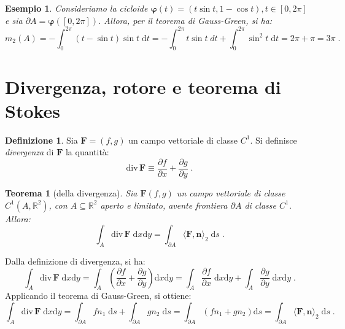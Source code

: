 \documentclass[a4paper,12pt]{report}
\theoremstyle{plain}
\newtheorem{thm}{Teorema}[section]
\newtheorem{exm}{Esempio}[section]
\theoremstyle{definition}
\newtheorem{defn}{Definizione}[section]
\theoremstyle{remark}
\newcommand{\Div}{\mathrm{div}\,}
\newcommand{\diff}[1]{\mathrm{d}#1}
\numberwithin{equation}{section}
\begin{document}
\begin{exm} Consideriamo la cicloide $\boldsymbol{\varphi}(t)=(t\sin t,1-\cos t),t\in[0,2\pi]$ e sia $\partial A=\boldsymbol{\varphi}([0,2\pi])$. Allora, per il teorema di Gauss-Green, si ha:
\begin{equation}
m_2(A)=-\int_0^{2\pi} (t-\sin t)\sin t\;\diff{t}=-\int_0^{2\pi}t\sin t\;dt+\int_0^{2\pi}\sin^2 t\;\diff{t} =2\pi+\pi=3\pi\;.
\end{equation}
\end{exm}
\section{Divergenza, rotore e teorema di Stokes}
\begin{defn} Sia $\mathbf{F}=(f,g)$ un campo vettoriale di classe $C^1$. Si definisce \textit{divergenza} di $\mathbf{F}$ la quantità:
\begin{equation}
\Div \mathbf{F}\equiv \frac{\partial f}{\partial x}+\frac{\partial g}{\partial y}\;.
\end{equation}
\end{defn}
\begin{thm}[della divergenza] Sia $\mathbf{F}(f,g)$ un campo vettoriale di classe $C^1(A,\mathbb{R}^2)$, con $A\subseteq\mathbb{R}^2$ aperto e limitato, avente frontiera $\partial A$ di classe $C^1$. Allora:
\begin{equation}
\int_A \Div \mathbf{F}\;\diff{x}\diff{y}=\int_{\partial A}\langle \mathbf{F},\mathbf{n}\rangle_2\;\diff{s}\;.
\end{equation}
\end{thm}
\proof Dalla definizione di divergenza, si ha:
\begin{equation}
\int_A \Div \mathbf{F}\;\diff{x}\diff{y}=\int_A \left(\frac{\partial f}{\partial x}+\frac{\partial g}{\partial y}\right)\diff{x}\diff{y}=\int_A\frac{\partial f}{\partial x}\;\diff{x}\diff{y}+\int_A \frac{\partial g}{\partial y}\;\diff{x}\diff{y}\;.
\end{equation}
Applicando il teorema di Gauss-Green, si ottiene:
\begin{equation}
\int_A\Div\mathbf{F}\;\diff{x}\diff{y}=\int_{\partial A}fn_1\;\diff{s}+\int_{\partial A}gn_2\;\diff{s}=\int_{\partial A}(fn_1+gn_2)\diff{s}=\int_{\partial A}\langle \mathbf{F},\mathbf{n}\rangle_2\;\diff{s}\;.
\end{equation}
\endproof
\end{document}
